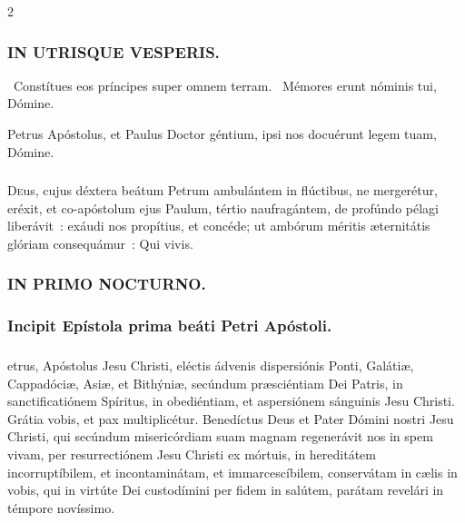 \documentclass[9pt,twoside]{extarticle}
\begin{document}
\begin{multicols}{2}
{\subsubsection*{\center \textsc{IN UTRISQUE VESPERIS.}}
\begin{tightlist}{}
\item {}~Constítues eos príncipes super omnem terram. ~Mémores erunt nóminis tui, Dómine.
\item {} Petrus Apóstolus, et Paulus Doctor géntium, ipsi nos docuérunt legem tuam, Dómine.
\end{tightlist}

\subsubsection*{\center {}}
\lettrine{D}eus, cujus déxtera beátum Petrum ambulántem in flúctibus, ne mergerétur, eréxit, et co-apóstolum ejus Paulum, tértio naufragántem, de profúndo pélagi liberávit~: exáudi nos propítius, et concéde; ut ambórum méritis æternitátis glóriam consequámur~: Qui vivis.

\subsubsection*{\center \textsc{IN PRIMO NOCTURNO.}}
\begin{tightlist}{}
\item {}
\item {}
\end{tightlist}

\subsubsection*{\center Incipit Epístola prima beáti Petri Apóstoli.}
\subsubsection*{\center {}}
etrus, Apóstolus Jesu Christi, eléctis ádvenis dispersiónis Ponti, Galátiæ, Cappadóciæ, Asiæ, et Bithýniæ,
secúndum præsciéntiam Dei Patris, in sanctificatiónem Spíritus, in obediéntiam, et aspersiónem sánguinis Jesu Christi. Grátia vobis, et pax multiplicétur.
Benedíctus Deus et Pater Dómini nostri Jesu Christi, qui secúndum misericórdiam suam magnam regenerávit nos in spem vivam, per resurrectiónem Jesu Christi ex mórtuis,
in hereditátem incorruptíbilem, et incontaminátam, et immarcescíbilem, conservátam in cælis in vobis,
qui in virtúte Dei custodímini per fidem in salútem, parátam revelári in témpore novíssimo.

}
\end{multicols}
\end{document}
